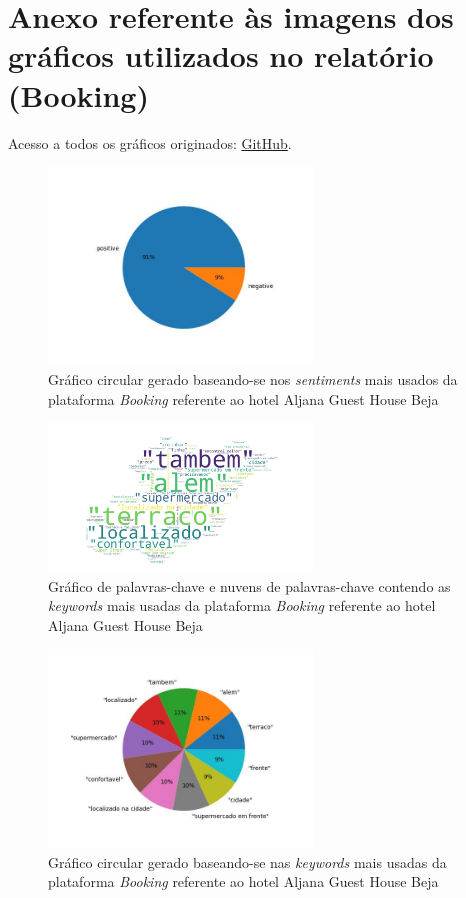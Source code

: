 \chapter{Anexo referente às imagens dos gráficos utilizados no relatório (Booking)}
\label{an4}

Acesso a todos os gráficos originados: \href{https://github.com/CatKinKitKat/pi2021/tree/master/projecto/datascience/graphs/booking/hotels}{GitHub}.

\begin{figure}[!htb]
\centering
\includegraphics[width=7cm]{figuras/Booking/hotel1_sentiments.jpeg}
\caption{Gráfico circular gerado baseando-se nos \textit{sentiments} mais usados da plataforma \textit{Booking} referente ao hotel Aljana Guest House Beja}
\label{fig:exemplofig}
\end{figure}

\begin{figure}[!htb]
\centering
\includegraphics[width=7cm]{figuras/Booking/hotel1_keywordcloud.jpeg}
\caption{Gráfico de palavras-chave e nuvens de palavras-chave contendo as \textit{keywords} mais usadas da plataforma \textit{Booking} referente ao hotel Aljana Guest House Beja}
\label{fig:exemplofig}
\end{figure}

\begin{figure}[!htb]
\centering
\includegraphics[width=7cm]{figuras/Booking/hotel1_keywords.jpeg}
\caption{Gráfico circular gerado baseando-se nas \textit{keywords} mais usadas da plataforma \textit{Booking} referente ao hotel Aljana Guest House Beja}
\label{fig:exemplofig}
\end{figure}

